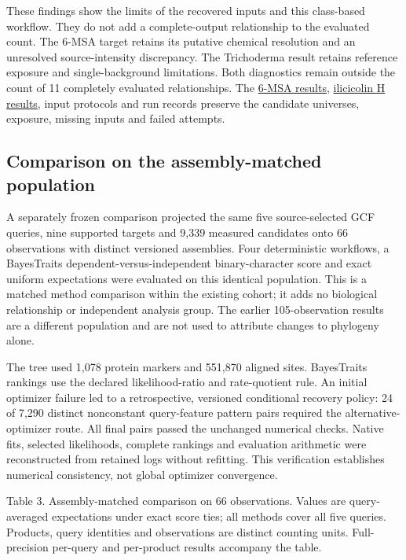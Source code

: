 \documentclass[
  10pt,
  a4paper,
]{article}
\begin{document}
These findings show the limits of the recovered inputs and this class-based workflow. They do not add a complete-output relationship to the evaluated count. The 6-MSA target retains its putative chemical resolution and an unresolved source-intensity discrepancy. The Trichoderma result retains reference exposure and single-background limitations. Both diagnostics remain outside the count of 11 completely evaluated relationships. The \href{https://github.com/vinvomero/fungallink-benchmark/blob/main/manuscript/tables/sixmsa-class-diagnostic-2026-10-09.tsv}{6-MSA results}, \href{https://github.com/vinvomero/fungallink-benchmark/blob/main/manuscript/tables/trichoderma-class-diagnostic-2026-10-11.tsv}{ilicicolin H results}, input protocols and run records preserve the candidate universes, exposure, missing inputs and failed attempts.

\subsection{Comparison on the assembly-matched population}\label{comparison-on-the-assembly-matched-population}

A separately frozen comparison projected the same five source-selected GCF queries, nine supported targets and 9,339 measured candidates onto 66 observations with distinct versioned assemblies. Four deterministic workflows, a BayesTraits dependent-versus-independent binary-character score and exact uniform expectations were evaluated on this identical population. This is a matched method comparison within the existing cohort; it adds no biological relationship or independent analysis group. The earlier 105-observation results are a different population and are not used to attribute changes to phylogeny alone.

The tree used 1,078 protein markers and 551,870 aligned sites. BayesTraits rankings use the declared likelihood-ratio and rate-quotient rule. An initial optimizer failure led to a retrospective, versioned conditional recovery policy: 24 of 7,290 distinct nonconstant query-feature pattern pairs required the alternative-optimizer route. All final pairs passed the unchanged numerical checks. Native fits, selected likelihoods, complete rankings and evaluation arithmetic were reconstructed from retained logs without refitting. This verification establishes numerical consistency, not global optimizer convergence.

Table 3. Assembly-matched comparison on 66 observations. Values are query-averaged expectations under exact score ties; all methods cover all five queries. Products, query identities and observations are distinct counting units. Full-precision per-query and per-product results accompany the table.
\end{document}
